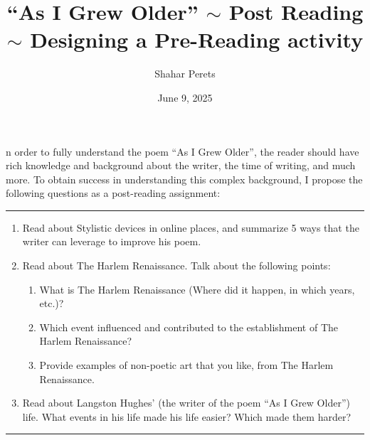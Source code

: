 \documentclass[]{article}
\author{Shahar Perets}
\title{``As I Grew Older'' $\sim$ Post Reading $\sim$ Designing a Pre-Reading activity}
\date{June 9, 2025}
\begin{document}
    \maketitle
    
    \large {}n order to fully understand the poem ``As I Grew Older'', the reader should have rich knowledge and background about the writer, the time of writing, and much more.  To obtain success in understanding this complex background, I propose the following questions as a post-reading assignment:
    
    \rule{\linewidth}{0.5pt}
    {\sf \begin{enumerate}
        \item Read about Stylistic devices in online places, and summarize 5 ways that the writer can leverage to improve his poem. 
        \item Read about The Harlem Renaissance. Talk about the following points: 
        \begin{enumerate}
            \item What is The Harlem Renaissance (Where did it happen, in which years, etc.)? 
            \item Which event influenced and contributed to the establishment of The Harlem Renaissance? 
            \item Provide examples of non-poetic art that you like, from The Harlem Renaissance. 
        \end{enumerate}
        \item Read about Langston Hughes' (the writer of the poem ``As I Grew Older'') life. What events in his life made his life easier? Which made them harder? 
    \end{enumerate}}
    \vspace{-0.20cm}
    \rule{\linewidth}{0.5pt}
    
\end{document}
